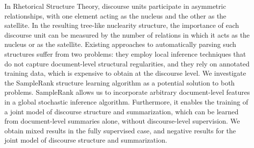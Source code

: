 In Rhetorical Structure Theory, discourse units participate in asymmetric relationships, with one element acting as the nucleus and the other as the satellite. In the resulting tree-like nuclearity structure, the importance of each discourse unit can be measured by the number of relations in which it acts as the nucleus or as the satellite. Existing approaches to automatically parsing such structures suffer from two problems: they employ local inference techniques that do not capture document-level structural regularities, and they rely on annotated training data, which is expensive to obtain at the discourse level. We investigate the SampleRank structure learning algorithm as a potential solution to both problems. SampleRank allows us to incorporate arbitrary document-level features in a global stochastic inference algorithm. Furthermore, it enables the training of a joint model of discourse structure and summarization, which can be learned from document-level summaries alone, without discourse-level supervision. We obtain mixed results in the fully supervised case, and negative results for the joint model of discourse structure and summarization.
